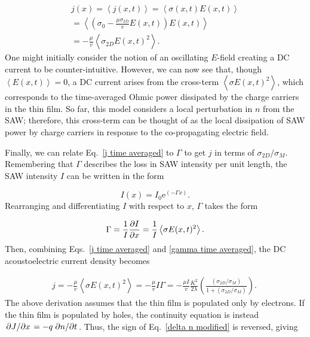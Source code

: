 \documentclass[double,12pt,1in,seploa]{beavtex}
\begin{document}
\begin{equation}
    \begin{split}
        j(x) = \left\langle j(x,t) \right\rangle = \left\langle \sigma(x,t) E(x,t) \right\rangle \\
        = \left\langle \left( \sigma_0 - \frac{\mu \sigma_{2D}}{v}E(x,t) \right) E(x,t)  \right\rangle \\
        = - \frac{\mu}{v}\left\langle\sigma_{2D} E(x,t)^2\right\rangle. 
    \end{split}
    \label{j time averaged}
\end{equation}
One might initially consider the notion of an oscillating $E$-field creating a DC current to be counter-intuitive. However, we can now see that, though $\left\langle E(x,t) \right\rangle = 0$, a DC current arises from the cross-term $\left\langle \sigma E(x,t) ^2 \right\rangle$, which corresponds to the time-averaged Ohmic power dissipated by the charge carriers in the thin film. So far, this model considers a local perturbation in $n$ from the SAW; therefore, this cross-term can be thought of as the local dissipation of SAW power by charge carriers in response to the co-propagating electric field. 


Finally, we can relate Eq.\ \ref{j time averaged} to $\Gamma$ to get $j$ in terms of $\sigma_{2D}/\sigma_M$. Remembering that $\Gamma$ describes the loss in SAW intensity per unit length, the SAW intensity $I$ can be written in the form

\begin{equation}
    I(x) = I_0 \mathrm{e}^{(-\Gamma x)}.
\end{equation}
Rearranging and differentiating $I$ with respect to $x$, $\Gamma$ takes the form

\begin{equation}
    \Gamma = \frac{1}{I} \pdv{I}{x} = \frac{1}{I}\left\langle\sigma E(x,t)^2\right\rangle. \label{gamma time averaged}
\end{equation}
Then, combining Eqs.\ \ref{j time averaged} and \ref{gamma time averaged}, the DC acoustoelectric current density becomes

\begin{equation}
    \begin{split}
        j = - \frac{\mu}{v}\left\langle\sigma E(x,t)^2\right\rangle = - \frac{\mu}{v} I\Gamma = - \frac{\mu I}{v} \frac{K^2}{2\lambda}(\frac{(\sigma_{2D}/\sigma_M)}{1+(\sigma_{2D}/\sigma_M)}). \
    \end{split}
    \label{DC AEC electron case}
\end{equation}
The above derivation assumes that the thin film is populated only by electrons. If the thin film is populated by holes, the continuity equation is instead $\pdv*{J}{x} = -q \pdv*{n}{t}$. Thus, the sign of Eq.\ \ref{delta n modified} is reversed, giving
\end{document}
